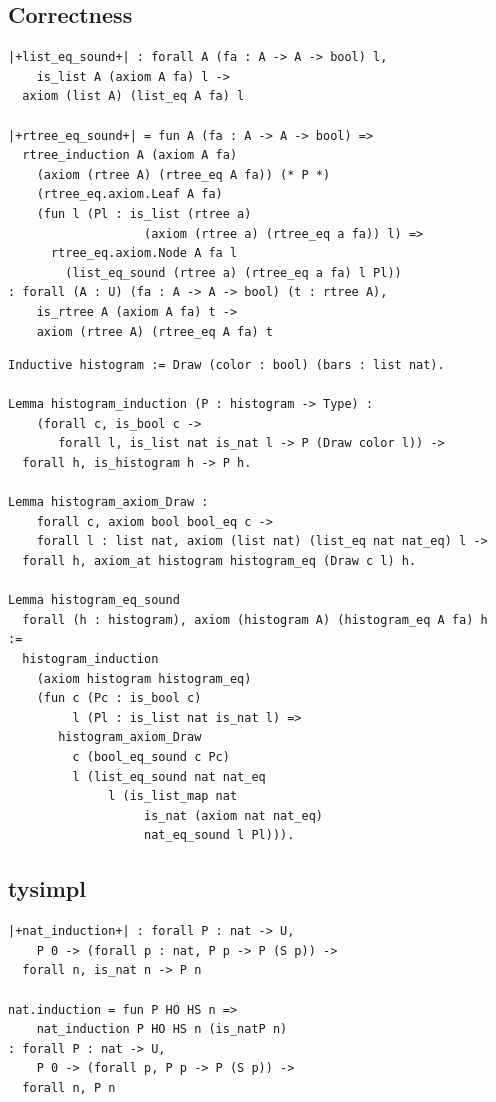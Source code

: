 \documentclass[sigplan,10pt,review]{acmart}\settopmatter{printfolios=true,printccs=false,printacmref=false}
\begin{document}
\subsection{Correctness} %
\label{sec:derive:eqOK}

\begin{lstlisting}
|+list_eq_sound+| : forall A (fa : A -> A -> bool) l,
    is_list A (axiom A fa) l ->
  axiom (list A) (list_eq A fa) l
       
|+rtree_eq_sound+| = fun A (fa : A -> A -> bool) =>
  rtree_induction A (axiom A fa)
    (axiom (rtree A) (rtree_eq A fa)) (* P *)
    (rtree_eq.axiom.Leaf A fa)
    (fun l (Pl : is_list (rtree a)
                   (axiom (rtree a) (rtree_eq a fa)) l) =>
      rtree_eq.axiom.Node A fa l
        (list_eq_sound (rtree a) (rtree_eq a fa) l Pl))
: forall (A : U) (fa : A -> A -> bool) (t : rtree A),
    is_rtree A (axiom A fa) t ->
    axiom (rtree A) (rtree_eq A fa) t
\end{lstlisting}

\begin{lstlisting}
Inductive histogram := Draw (color : bool) (bars : list nat).

Lemma histogram_induction (P : histogram -> Type) :
    (forall c, is_bool c ->
       forall l, is_list nat is_nat l -> P (Draw color l)) ->
  forall h, is_histogram h -> P h.

Lemma histogram_axiom_Draw :
    forall c, axiom bool bool_eq c ->
    forall l : list nat, axiom (list nat) (list_eq nat nat_eq) l ->
  forall h, axiom_at histogram histogram_eq (Draw c l) h.

Lemma histogram_eq_sound 
  forall (h : histogram), axiom (histogram A) (histogram_eq A fa) h
:=
  histogram_induction 
    (axiom histogram histogram_eq)
    (fun c (Pc : is_bool c)
         l (Pl : is_list nat is_nat l) =>
       histogram_axiom_Draw
         c (bool_eq_sound c Pc)
         l (list_eq_sound nat nat_eq
              l (is_list_map nat
                   is_nat (axiom nat nat_eq)
                   nat_eq_sound l Pl))).
\end{lstlisting}

\subsection{tysimpl} %

\begin{lstlisting}
|+nat_induction+| : forall P : nat -> U,
    P 0 -> (forall p : nat, P p -> P (S p)) ->
  forall n, is_nat n -> P n

nat.induction = fun P HO HS n =>
    nat_induction P HO HS n (is_natP n)
: forall P : nat -> U,
    P 0 -> (forall p, P p -> P (S p)) ->
  forall n, P n
\end{lstlisting}
\end{document}
